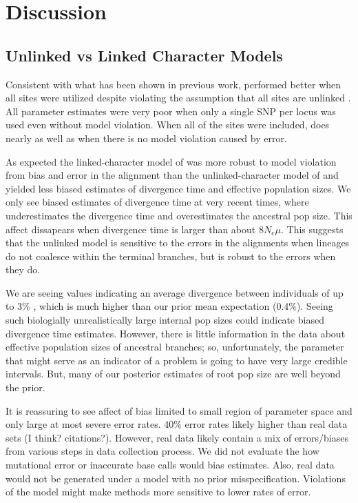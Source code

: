 \section{Discussion}

\subsection{Unlinked vs Linked Character Models}
Consistent with what has been shown in previous work, \ecoevolity performed 
better when all sites were utilized despite violating the assumption that all 
sites are unlinked \citep{Oaks2018ecoevolity}. All parameter estimates were very
poor when only a single SNP per locus was used even without model violation. 
When all of the sites were included, \ecoevolity does nearly as well as \beast 
when there is no model violation caused by error.

As expected the linked-character model of \beast was more robust to model 
violation from bias and error in the alignment than the unlinked-character 
model of \ecoevolity and yielded less biased 
estimates of divergence time and effective population sizes. 
We only see biased estimates of divergence time at very recent times, 
where \ecoevolity
underestimates the divergence time and overestimates the ancestral pop size.
This affect dissapears when divergence time is larger than about $8N_e\mu$.
This suggests that the unlinked model is sensitive to the errors in the alignments
when lineages do not coalesce within the terminal branches,
but is robust to the errors when they do.

We are seeing values indicating an average divergence between individuals of up
to 3\% \rootfigs, which is much higher than our prior mean expectation (0.4\%).
Seeing such biologially unrealistically large internal pop sizes could indicate
biased divergence time estimates.
However, there is little information in the data about effective population sizes 
of ancestral branches; so, unfortunately, the parameter that might serve as an indicator
of a problem is going to have very large credible intervals.
But, many of our posterior estimates of root pop size are well beyond the
prior.

It is reassuring to see affect of bias limited to small region of parameter 
space and only large at most severe error rates.
40\% error rates likely higher than real data sets (I think? citations?).
However, real data likely contain a mix of errors/biases from
various steps in data collection process. We did not evaluate the how mutational
error or inaccurate base calls would bias estimates.
Also, real data would not be generated under a model with no prior misspecification.
Violations of the model might make methods more sensitive to lower rates of error.

